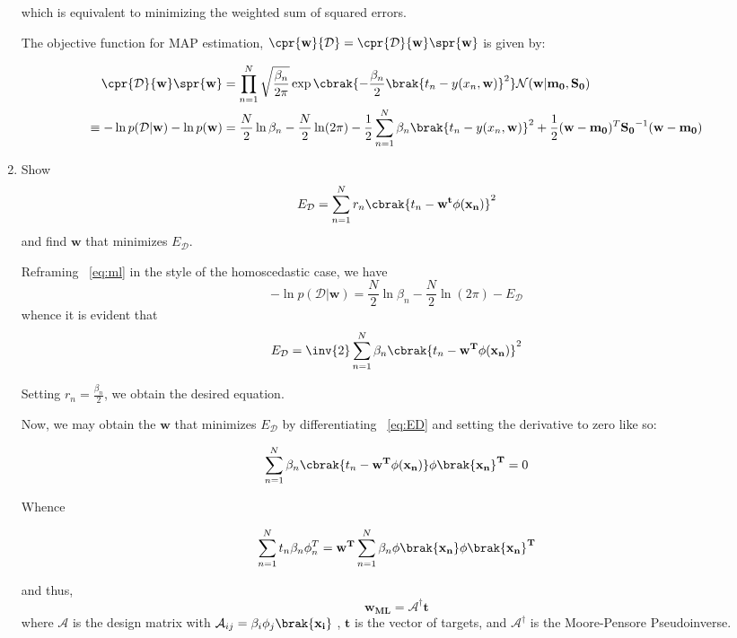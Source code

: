 \documentclass{amsart}
\begin{document}
\begin{enumerate}
        which is equivalent to minimizing the weighted sum of squared errors.

        The objective function for MAP estimation, \(\cpr{\mathbf{w}}{\mathcal{D}} =  \cpr{\mathcal{D}}{\mathbf{w}} \spr{\mathbf{w}}\) is given by:

        \begin{align}
            \cpr{\mathcal{D}}{\mathbf{w}} \spr{\mathbf{w}} &= \prod_{n = 1}^{N} \sqrt{\frac{\beta_n}{2\pi}} \exp \cbrak{- \frac{\beta_n}{2} \brak{t_n - y(x_n, \mathbf{w})}^2} \mathcal{N}(\mathbf{w} | \mathbf{m_0}, \mathbf{S_0}) \\
            \equiv -\ln p(\mathcal{D} | \mathbf{w}) - \ln p(\mathbf{w}) &= \frac{N}{2} \ln \beta_n - \frac{N}{2} \ln (2\pi) - \frac{1}{2} \sum_{n = 1}^{N} \beta_n \brak{t_n - y(x_n, \mathbf{w})}^2 + \frac{1}{2} (\mathbf{w - m_0})^T \mathbf{S_0}^{-1} (\mathbf{w - m_0})
        \end{align}

        \item Show \[E_\mathcal{D} = \sum_{n = 1}^{N} r_n \cbrak{t_n - \mathbf{w^t \phi(x_n)}}^2 \] and find \(\mathbf{w}\) that minimizes \(E_\mathcal{D}\).
        
        Reframing ~\ref{eq:ml} in the style of the homoscedastic case, we have \[-\ln p(\mathcal{D} | \mathbf{w}) = \frac{N}{2} \ln \beta_n - \frac{N}{2} \ln (2\pi) - E_\mathcal{D}\] whence it is evident that \[E_\mathcal{D} = \inv{2} \sum_{n = 1}^{N} \beta_n \cbrak{t_n - \mathbf{w^T \phi(x_n)}}^2 \label{eq:ED} \]

        Setting \(r_n = \frac{\beta_n}{2}\), we obtain the desired equation.

        Now, we may obtain the \(\mathbf{w}\) that minimizes \(E_\mathcal{D}\) by differentiating ~\ref{eq:ED} and setting the derivative to zero like so:

        \[\sum_{n = 1}^{N} \beta_n \cbrak{t_n - \mathbf{w^T \phi(x_n)}} \mathbf{\phi\brak{x_n}^T} = 0\]

        Whence 

        \[ \sum_{n = 1}^{N} t_n \beta_n \phi_n^T = \mathbf{w^T}\sum_{n = 1}^{N} \beta_n \mathbf{\phi\brak{x_n}\phi\brak{x_n}^T}\]

        and thus, 
        \[\mathbf{w_{ML}} = \mathcal{A^\dagger} \mathbf{t}\]
        where \(\mathcal{A}\) is the design matrix with \(\mathcal{A}_{ij} = \beta_i \phi_j \mathbf{\brak{x_i}} \) , \(\mathbf{t}\) is the vector of targets, and \(\mathcal{A^\dagger}\) is the Moore-Pensore Pseudoinverse.
        
    \end{enumerate}
\end{document}
